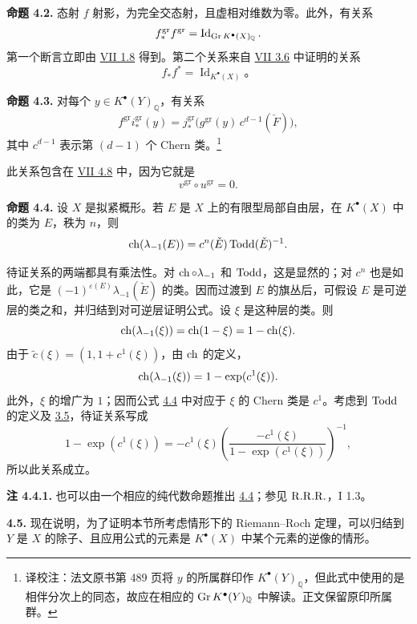 \textbf{命题 4.2.} 态射 \(f\) 射影，为完全交态射，且虚相对维数为零。此外，有关系
\[
 f^{\mathrm{gr}}_* f^{\mathrm{gr}}=\operatorname{Id}_{\operatorname{Gr} K^{\bullet}(X)_{\mathbb Q}} .
\]
第一个断言立即由 \hyperlink{sga6.e07.prop.1-8}{VII 1.8} 得到。第二个关系来自 \hyperlink{sga6.e07.prop.3-6}{VII 3.6} 中证明的关系
\[
 f_*f^*=\operatorname{Id}_{K^{\bullet}(X)}
\text{。}
\]


\textbf{命题 4.3.} 对每个 \(y\in K^{\bullet}(Y)_{\mathbb Q}\)，有关系
\[
 f^{\mathrm{gr}} i^{\mathrm{gr}}_*(y)
 =
 j^{\mathrm{gr}}_*\bigl(g^{\mathrm{gr}}(y)\,c^{d-1}(\check F)\bigr),
\]
其中 \(c^{d-1}\) 表示第 \((d-1)\) 个 Chern 类。\footnote{译校注：法文原书第 489 页将 \(y\) 的所属群印作 \(K^\bullet(Y)_{\mathbb Q}\)，但此式中使用的是相伴分次上的同态，故应在相应的 \(\operatorname{Gr} K^\bullet(Y)_{\mathbb Q}\) 中解读。正文保留原印所属群。}

此关系包含在 \hyperlink{sga6.e07.thm.4-8}{VII 4.8} 中，因为它就是
\[
 v^{\mathrm{gr}}\circ u^{\mathrm{gr}}=0 .
\]

\textbf{命题 4.4.} 设 \(X\) 是拟紧概形。若 \(E\) 是 \(X\) 上的有限型局部自由层，在 \(K^{\bullet}(X)\) 中的类为 \(E\)，秩为 \(n\)，则
\[
 \operatorname{ch}(\lambda_{-1}(E))=c^n(\check E)\operatorname{Todd}(\check E)^{-1}.
\]

待证关系的两端都具有乘法性。对 \(\operatorname{ch}\circ\lambda_{-1}\) 和 \(\operatorname{Todd}\)，这是显然的；对 \(c^n\) 也是如此，它是 \((-1)^{\varepsilon(E)}\lambda_{-1}(\check E)\) 的类。因而过渡到 \(E\) 的旗丛后，可假设 \(E\) 是可逆层的类之和，并归结到对可逆层证明公式。设 \(\xi\) 是这种层的类。则
\[
 \operatorname{ch}(\lambda_{-1}(\xi))=\operatorname{ch}(1-\xi)=1-\operatorname{ch}(\xi).
\]
由于 \(\widetilde c(\xi)=(1,1+c^1(\xi))\)，由 \(\operatorname{ch}\) 的定义，
\[
 \operatorname{ch}(\lambda_{-1}(\xi))=1-\exp(c^1(\xi)).
\]
此外，\(\xi\) 的增广为 \(1\)；因而公式 \hyperlink{sga6.e08.prop.4-4}{4.4} 中对应于 \(\xi\) 的 Chern 类是 \(c^1\)。考虑到 \(\operatorname{Todd}\) 的定义及 \hyperlink{sga6.e08.prop.3-5}{3.5}，待证关系写成
\[
 1-\exp(c^1(\xi))
 =
 -c^1(\xi)\left(\frac{-c^1(\xi)}{1-\exp(c^1(\xi))}\right)^{-1},
\]
所以此关系成立。

\textbf{注 4.4.1.} 也可以由一个相应的纯代数命题推出 \hyperlink{sga6.e08.prop.4-4}{4.4}；参见 \(\mathrm{R.R.R.}\)，I 1.3。

\textbf{4.5.} 现在说明，为了证明本节所考虑情形下的 Riemann--Roch 定理，可以归结到 \(Y\) 是 \(X\) 的除子、且应用公式的元素是 \(K^{\bullet}(X)\) 中某个元素的逆像的情形。

